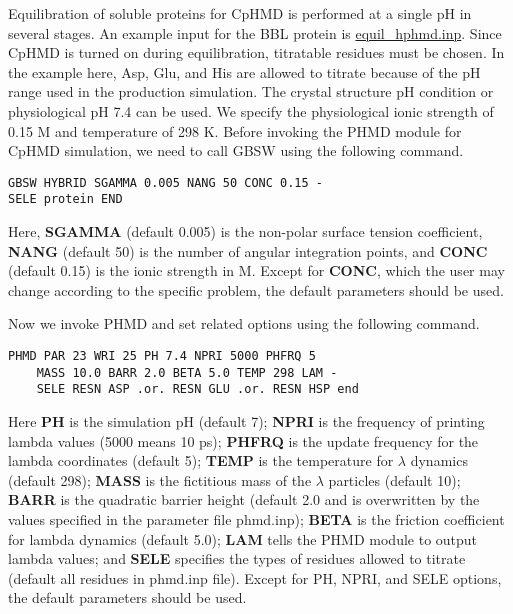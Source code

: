 Equilibration of soluble proteins for CpHMD is performed at a single pH in several stages. 
An example input for the BBL protein is
\href{https://gitlab.com/shenlab-amber-cphmd/cphmd-tutorial/-/tree/main/hphmd_charmm/bbl_equil_prod}{equil\_hphmd.inp}.
Since CpHMD is turned on during equilibration, titratable residues must be chosen. 
In the example here, Asp, Glu, and His are allowed to titrate because of the pH range used in the production simulation.
The crystal structure pH condition or physiological pH 7.4 can be used.
We specify the physiological ionic strength of 0.15 M and temperature of 298 K.
Before invoking the PHMD module for CpHMD
simulation, we need to call GBSW using the following command.
%
\begin{lstlisting}
GBSW HYBRID SGAMMA 0.005 NANG 50 CONC 0.15 - 
SELE protein END
\end{lstlisting}
%
Here, \textbf{SGAMMA} (default 0.005) is the non-polar surface tension coefficient, \textbf{NANG} (default 50) is the number of angular integration points, and \textbf{CONC} (default 0.15) is the ionic strength in M.
Except for \textbf{CONC}, which the user may change according to the specific problem, the default parameters should be used.

Now we invoke PHMD and set related options using the following command.

\begin{lstlisting}
PHMD PAR 23 WRI 25 PH 7.4 NPRI 5000 PHFRQ 5 
    MASS 10.0 BARR 2.0 BETA 5.0 TEMP 298 LAM -
    SELE RESN ASP .or. RESN GLU .or. RESN HSP end
\end{lstlisting}
%
Here \textbf{PH} is the simulation pH (default 7);
\textbf{NPRI} is the frequency of printing lambda values (5000 means 10 ps);
\textbf{PHFRQ} is the update frequency for the lambda coordinates (default 5);
\textbf{TEMP} is the temperature for $\lambda$ dynamics (default 298);
\textbf{MASS} is the fictitious mass of the $\lambda$ particles (default 10); 
\textbf{BARR} is the quadratic barrier height (default 2.0 and is overwritten by the values specified in the parameter file phmd.inp); 
\textbf{BETA} is the friction coefficient for lambda dynamics (default 5.0); 
\textbf{LAM} tells the PHMD module to output lambda values; and
\textbf{SELE} specifies the types of residues allowed to titrate (default all residues in phmd.inp file). 
Except for PH, NPRI, and SELE options, 
the default parameters should be used.

